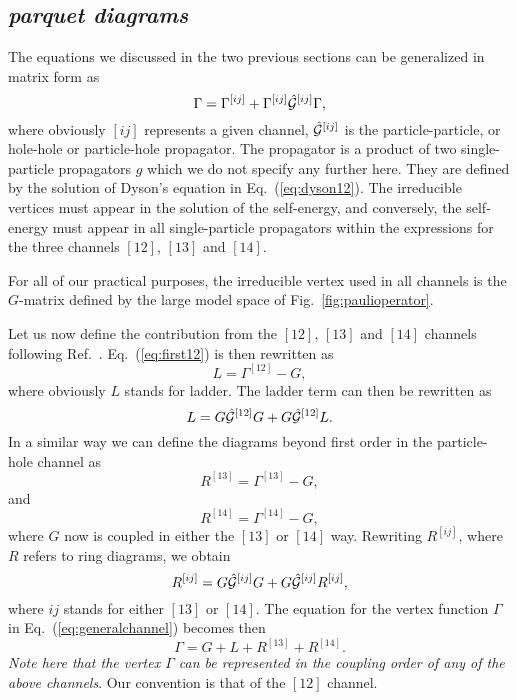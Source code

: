 \documentclass[twoside,12pt]{article}
\begin{document}
\subsection{\it parquet diagrams}

The equations we discussed in the two previous sections can
be generalized
in matrix form as
\begin{equation}
      \Gamma= \Gamma^{[ij]}+\Gamma^{[ij]}\hat{{\cal G}}^{[ij]}\Gamma,
      \label{eq:generalchannel}
\end{equation}
where obviously $[ij]$ represents a given channel,
$\hat{{\cal G}}^{[ij]}$ is the particle-particle, or hole-hole or particle-hole
propagator.
The propagator is a product of two single-particle propagators $g$
which we do not specify any further here. They are
defined by the solution of Dyson's equation in Eq.\ (\ref{eq:dyson12}).
The irreducible vertices must appear in the solution of
the self-energy, and conversely, the self-energy must appear in all
single-particle propagators within the expressions for the three
channels $[12]$, $[13]$ and $[14]$.

For all of our practical purposes, the irreducible vertex used in all
channels is the $G$-matrix defined by the large model space of 
Fig.~\ref{fig:paulioperator}. 

Let us now define the contribution from the $[12]$, $[13]$ and
$[14]$ channels following Ref.\ \cite{jls82}.
Eq.\ (\ref{eq:first12}) is then rewritten as
\begin{equation}
    L=\Gamma^{[12]}-G,
\end{equation}
where obviously $L$ stands for ladder.
The ladder term can then be rewritten as
\begin{equation}
    L=G\hat{{\cal G}}^{[12]}G+G\hat{{\cal G}}^{[12]}L.
    \label{eq:ladder}
\end{equation}
In a similar way we can define the diagrams beyond
first order in the particle-hole channel as
\begin{equation}
    R^{[13]}=\Gamma^{[13]}-G,
\end{equation}
and
\begin{equation}
    R^{[14]}=\Gamma^{[14]}-G,
\end{equation}
where $G$ now is coupled in either the $[13]$ or $[14]$ way.
Rewriting $R^{[ij]}$, where $R$ refers to ring diagrams,
we obtain
\begin{equation}
    R^{[ij]}=G\hat{{\cal G}}^{[ij]}G+G\hat{{\cal G}}^{[ij]}R^{[ij]},
    \label{eq:ring}
\end{equation}
where $ij$ stands for either $[13]$ or $[14]$.
The equation for the vertex function $\Gamma$ in Eq.\
(\ref{eq:generalchannel}) becomes then
\begin{equation}
    \Gamma=G+L+R^{[13]}+R^{[14]}.
     \label{eq:gammap}
\end{equation}
{\em Note here that the vertex $\Gamma$ can be represented in the coupling
order of any of the above channels}. Our convention is that of the
$[12]$ channel.
\end{document}
